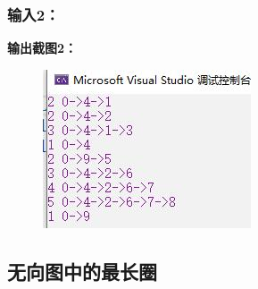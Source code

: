 \documentclass[UTF8]{article}
\begin{document}
	\subsubsection{输入2：}\par
	\par
	\textbf{输出截图2：}\par
	\begin{figure}[H]
		\centering
		\includegraphics[scale=1]{output22.jpg}
		\label{output22}
	\end{figure}\par
	
	
	
	\subsection{无向图中的最长圈}
\end{document}
